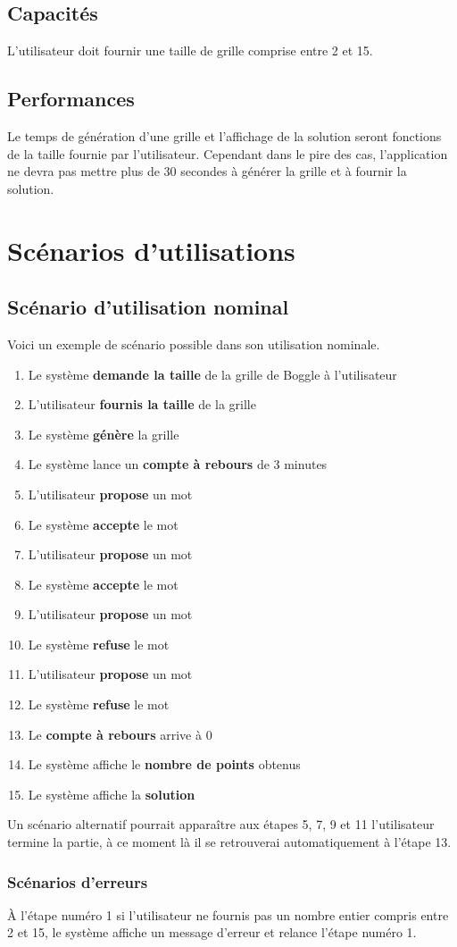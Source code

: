 \documentclass[12pt,a4paper,openany]{article}
\begin{document}
	\subsection{Capacités}
	L'utilisateur doit fournir une taille de grille comprise entre 2 et 15.
	\subsection{Performances}
	Le temps de génération d'une grille et l'affichage de la solution seront fonctions de la taille fournie par l'utilisateur. Cependant dans le pire
	des cas, l'application ne devra pas mettre plus de 30 secondes à générer la grille et à fournir la solution.

	\section{Scénarios d'utilisations}
	\subsection{Scénario d'utilisation nominal}
	Voici un exemple de scénario possible dans son utilisation nominale.
		\begin{enumerate}
			\item Le système \textbf{demande la taille} de la grille de Boggle à l'utilisateur
			\item L'utilisateur \textbf{fournis la taille} de la grille 
			\item Le système \textbf{génère} la grille
			\item Le système lance un \textbf{compte à rebours} de 3 minutes
			\item L'utilisateur \textbf{propose} un mot
			\item Le système \textbf{accepte} le mot
			\item L'utilisateur \textbf{propose} un mot
			\item Le système \textbf{accepte} le mot
			\item L'utilisateur \textbf{propose} un mot
			\item Le système \textbf{refuse }le mot
			\item L'utilisateur \textbf{propose} un mot
			\item Le système \textbf{refuse} le mot
			\item Le \textbf{compte à rebours} arrive à 0
			\item Le système affiche le \textbf{nombre de points} obtenus
			\item Le système affiche la \textbf{solution}
		\end{enumerate}

		Un scénario alternatif pourrait apparaître aux étapes 5, 7, 9 et 11 l'utilisateur termine la partie, à ce moment là il se retrouverai automatiquement à
		l'étape 13.
	\subsubsection{Scénarios d'erreurs}
		À l'étape numéro 1 si l'utilisateur ne fournis pas un nombre entier compris entre 2 et 15, le système affiche un message d'erreur
			et relance l'étape numéro 1.
	
\end{document}
